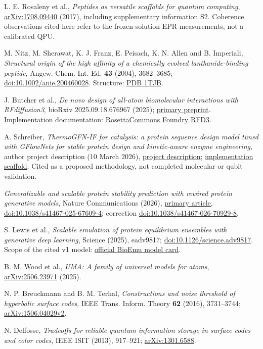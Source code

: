 L. E. Rosaleny et al., \emph{Peptides as versatile scaffolds for quantum computing},
\href{https://arxiv.org/abs/1708.09440}{arXiv:1708.09440} (2017),
including supplementary information S2. Coherence observations cited here
refer to the frozen-solution EPR measurements, not a calibrated QPU.

M. Nitz, M. Sherawat, K. J. Franz, E. Peisach, K. N. Allen and B. Imperiali,
\emph{Structural origin of the high affinity of a chemically evolved
lanthanide-binding peptide}, Angew. Chem. Int. Ed. \textbf{43} (2004),
3682--3685; \href{https://doi.org/10.1002/anie.200460028}{doi:10.1002/anie.200460028}.
Structure: \href{https://www.rcsb.org/structure/1TJB}{PDB 1TJB}.

J. Butcher et al., \emph{De novo design of all-atom biomolecular interactions
with RFdiffusion3}, bioRxiv 2025.09.18.676967 (2025);
\href{https://pmc.ncbi.nlm.nih.gov/articles/PMC12458353/}{primary preprint}.
Implementation documentation:
\href{https://github.com/RosettaCommons/foundry/blob/production/models/rfd3/README.md}{RosettaCommons Foundry RFD3}.

A. Schreiber, \emph{ThermoGFN-IF for catalysis: a protein sequence design model
tuned with GFlowNets for stable protein design and kinetic-aware enzyme
engineering}, author project description (10 March 2026),
\href{https://huggingface.co/blog/AmelieSchreiber/thermogfn-if}{project description};
\href{https://github.com/amelie-iska/ThermoGFN-IF}{implementation scaffold}.
Cited as a proposed methodology, not completed molecular or qubit validation.

\emph{Generalizable and scalable protein stability prediction with rewired
protein generative models}, Nature Communications (2026),
\href{https://pmc.ncbi.nlm.nih.gov/articles/PMC12830971/}{primary article},
\href{https://doi.org/10.1038/s41467-025-67609-4}{doi:10.1038/s41467-025-67609-4};
correction \href{https://doi.org/10.1038/s41467-026-70929-8}{doi:10.1038/s41467-026-70929-8}.

S. Lewis et al., \emph{Scalable emulation of protein equilibrium ensembles
with generative deep learning}, Science (2025), eadv9817;
\href{https://doi.org/10.1126/science.adv9817}{doi:10.1126/science.adv9817}.
Scope of the cited v1 model:
\href{https://github.com/microsoft/bioemu/blob/main/MODEL_CARD.md}{official BioEmu model card}.

B. M. Wood et al., \emph{UMA: A family of universal models for atoms},
\href{https://arxiv.org/abs/2506.23971}{arXiv:2506.23971} (2025).

N. P. Breuckmann and B. M. Terhal, \emph{Constructions and noise threshold
of hyperbolic surface codes}, IEEE Trans. Inform. Theory \textbf{62} (2016),
3731--3744; \href{https://arxiv.org/abs/1506.04029v2}{arXiv:1506.04029v2}.

N. Delfosse, \emph{Tradeoffs for reliable quantum information storage in
surface codes and color codes}, IEEE ISIT (2013), 917--921;
\href{https://arxiv.org/abs/1301.6588}{arXiv:1301.6588}.
